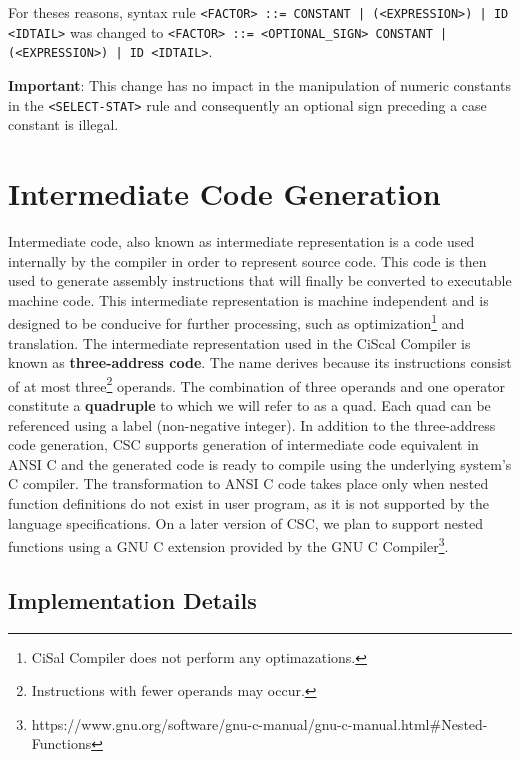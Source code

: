 \documentclass{article}
\def\code#1{\texttt{#1}} %
\begin{document}
For theses reasons, syntax rule \code{<FACTOR> ::= CONSTANT | (<EXPRESSION>) | ID <IDTAIL>} was
changed to \code{<FACTOR> ::= <OPTIONAL\_SIGN> CONSTANT | (<EXPRESSION>) | ID <IDTAIL>}.

\textbf{Important}: This change has no impact in the manipulation of numeric constants in the \code{<SELECT-STAT>}
rule and consequently an optional sign preceding a case constant is illegal.


\section{Intermediate Code Generation}
Intermediate code, also known as intermediate representation is a code used internally by the compiler
in order to represent source code. This code is then used to generate assembly instructions that will finally
be converted to executable machine code. This intermediate representation is machine independent
and is designed to be conducive for further processing, such as optimization\footnote{CiSal Compiler
does not perform any optimazations.} and translation. The intermediate representation used in the CiScal
Compiler is known as \textbf{three-address code}. The name derives because its instructions consist of
at most three\footnote{Instructions with fewer operands may occur.} operands. The combination of three
operands and one operator constitute a \textbf{quadruple} to which we will refer to as a quad. Each quad
can be referenced using a label (non-negative integer). In addition to the three-address code generation,
CSC supports generation of intermediate code equivalent in ANSI C and the generated code is ready to compile
using the underlying system's C compiler. The transformation to ANSI C code takes place only when nested
function definitions do not exist in user program, as it is not supported by the language specifications.
On a later version of CSC, we plan to support nested functions using a GNU C extension provided by the GNU
C Compiler\footnote{https://www.gnu.org/software/gnu-c-manual/gnu-c-manual.html\#Nested-Functions}.


\subsection{Implementation Details}
\end{document}
